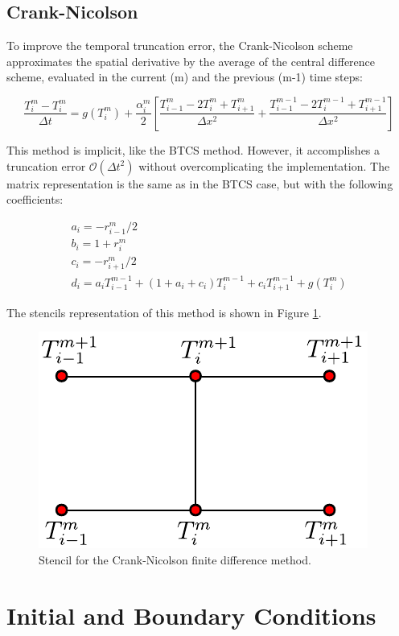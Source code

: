 \subsection{Crank-Nicolson}

To improve the temporal truncation error, the Crank-Nicolson scheme approximates the spatial derivative by the average of the central difference scheme, evaluated in the current (m) and the previous (m-1) time steps: 

\begin{equation}
    \frac{T^m_i - T^m_i}{\Delta t} = g(T^m_i) + \frac{\alpha^m_i}{2}\left[ 
          \frac{T^m_{i-1}- 2 T^m_i + T_{i+1}^m}{\Delta x^2} + \frac{T^{m-1}_{i-1}-2T^{m-1}_i+T_{i+1}^{m-1}}{\Delta x^2}
    \right] 
\end{equation}

This method is implicit, like the BTCS method. However, it accomplishes a truncation error $\mathcal{O}(\Delta t^2)$ without overcomplicating the implementation. The matrix representation is the same as in the BTCS case, but with the following coefficients:

\begin{equation}
    \begin{gathered}
        a_i = -r^m_{i-1}/2 \\
        b_i = 1 + r^m_{i}\\
        c_i = - r^m_{i+1}/2 \\
        d_i = a_i T_{i-1}^{m-1} + (1 + a_i + c_i) T^{m-1}_{i} + c_i T_{i+1}^{m-1} + g(T_i^m)
    \end{gathered}
\end{equation}

The stencils representation of this method is shown in Figure \ref{fig:StencilCrNic}.

\begin{figure}[h]
    \centering
    \includegraphics[width=0.35\columnwidth]{Stencils_FiniteDifferences/CrkNic.pdf}
    \caption{Stencil for the Crank-Nicolson finite difference method.}
    \label{fig:StencilCrNic}
\end{figure}

\section{Initial and Boundary Conditions}

